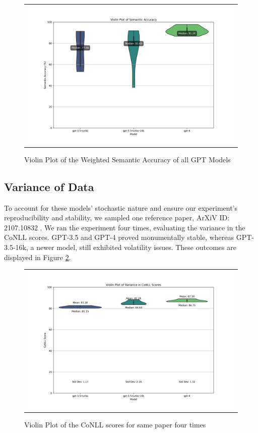 \begin{figure}[htpb]
  \centering
  \begin{tabular}{c}
  \includegraphics[width=14cm]{images/semantic-accuracy.png}
  \end{tabular}
  \caption[Semantic Accuracy]{Violin Plot of the Weighted Semantic Accuracy of all GPT Models}\label{fig:violin-semantic}
\end{figure}

\subsection{Variance of Data}

To account for these models' stochastic nature and ensure our experiment's reproducibility and stability, we sampled one reference paper, ArXiV ID: 2107.10832 \citep{singleton2021logic}. We ran the experiment four times, evaluating the variance in the CoNLL scores. GPT-3.5 and GPT-4 proved monumentally stable, whereas GPT-3.5-16k, a newer model, still exhibited volatility issues. These outcomes are displayed in Figure \ref{fig:violin-variance}.

\begin{figure}[htpb]
  \centering
  \begin{tabular}{c}
  \includegraphics[width=14cm]{images/variance-conll.png}
  \end{tabular}
  \caption[The variance]{Violin Plot of the CoNLL scores for same paper four times}\label{fig:violin-variance}
\end{figure}

